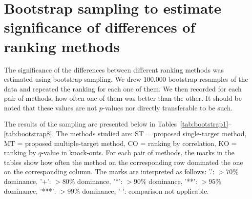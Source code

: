 \documentclass{article}
\begin{document}
\begin{figure}[tb]
{%
\label{fig:dros_focused_evaluation}
}
\end{figure}

\section{Bootstrap sampling to estimate significance of differences of
  ranking methods}

The significance of the differences between different ranking methods
was estimated using bootstrap sampling.  We drew $100.000$ bootstrap
resamples of the data and repeated the ranking for each one of them.
We then recorded for each pair of methods, how often one of them was
better than the other.  It should be noted that these values are not
$p$-values nor directly transferable to be such.

The results of the sampling are presented below in
Tables~\ref{tab:bootstrap1}--\ref{tab:bootstrap8}.  The methods
studied are: ST = proposed single-target method, MT = proposed
multiple-target method, CO = ranking by correlation, KO = ranking by
$q$-value in knock-outs.  For each pair of methods, the marks in the
tables show how often the method on the corresponding row dominated
the one on the corresponding column.  The marks are interpreted as
follows: '.': $> 70 \%$ dominance, '+': $> 80 \%$ dominance,
'*': $> 90 \%$ dominance, '**': $> 95 \%$ dominance, '***': $> 99 \%$
dominance, '-': comparison not applicable.
\end{document}
